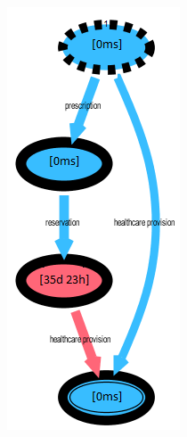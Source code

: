 \begin{figure} [htbp]
\begin{minipage}[t]{0.3\textwidth}
\includegraphics[width=\textwidth, keepaspectratio]{AmbulatorioSojournForeigns}

\end{minipage}
\end{figure}
